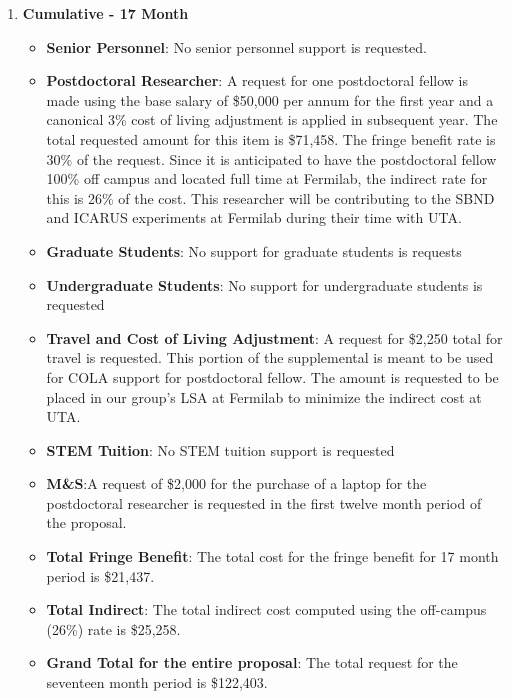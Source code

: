 \begin{enumerate}
\item{\bf Cumulative - 17 Month}

\begin{itemize}[noitemsep,nolistsep]
\item{{\bf Senior Personnel}: No senior personnel support is requested.}

\item {{\bf Postdoctoral Researcher}: A request for one postdoctoral fellow is made using the base salary of \$50,000 per annum for the first year and a canonical 3\% cost of living adjustment is applied in subsequent year.  The total requested amount for this item is \$71,458. The fringe benefit rate is 30\% of the request.  Since it is anticipated to have the postdoctoral fellow 100\% off campus and located full time at Fermilab, the indirect rate for this is 26\% of the cost.  This researcher will be contributing to the SBND and ICARUS experiments at Fermilab during their time with UTA.} 

\item{{\bf Graduate Students}: No support for graduate students is requests}

\item {{\bf Undergraduate Students}: No support for undergraduate students is requested}

\item{{\bf Travel and Cost of Living Adjustment}: A request for \$2,250 total for travel is requested.  This portion of the supplemental is meant to be used for COLA support for postdoctoral fellow. The amount is requested to be placed in our group’s LSA at Fermilab to minimize the indirect cost at UTA.}

\item {{\bf STEM Tuition}: No STEM tuition support is requested}

\item {{\bf M\&S}:A request of \$2,000 for the purchase of a laptop for the postdoctoral researcher is requested in the first twelve month period of the proposal.}

\item {{\bf Total Fringe Benefit}: The total cost for the fringe benefit for 17 month period is \$21,437.}

\item {{\bf Total Indirect}: The total indirect cost computed using the off-campus (26\%) rate is \$25,258.}

\item {{\bf Grand Total for the entire proposal}: The total request for the seventeen month period is \$122,403.}


\end{itemize}
\end{enumerate}

